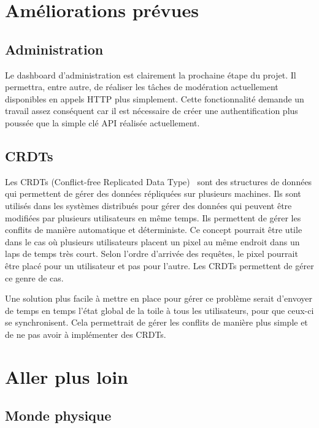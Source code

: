 
\section{Améliorations prévues}

\subsection{Administration}

Le dashboard d'administration est clairement la prochaine étape du projet. Il permettra, entre autre, de réaliser les tâches de modération actuellement disponibles en appels HTTP plus simplement. Cette fonctionnalité demande un travail assez conséquent car il est nécessaire de créer une authentification plus poussée que la simple clé API réalisée actuellement.

\subsection{CRDTs}

Les CRDTs (Conflict-free Replicated Data Type)~\cite{crdt} sont des structures de données qui permettent de gérer des données répliquées sur plusieurs machines. Ils sont utilisés dans les systèmes distribués pour gérer des données qui peuvent être modifiées par plusieurs utilisateurs en même temps. Ils permettent de gérer les conflits de manière automatique et déterministe. Ce concept pourrait être utile dans le cas où plusieurs utilisateurs placent un pixel au même endroit dans un laps de temps très court. Selon l'ordre d'arrivée des requêtes, le pixel pourrait être placé pour un utilisateur et pas pour l'autre. Les CRDTs permettent de gérer ce genre de cas.

Une solution plus facile à mettre en place pour gérer ce problème serait d'envoyer de temps en temps l'état global de la toile à tous les utilisateurs, pour que ceux-ci se synchronisent. Cela permettrait de gérer les conflits de manière plus simple et de ne pas avoir à implémenter des CRDTs.

\section{Aller plus loin}

\subsection{Monde physique}

